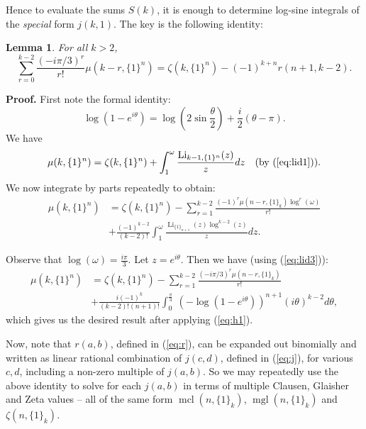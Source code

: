 \documentclass[a4paper,a4paper]{article}
\newtheorem{Lem}{Lemma}
\newcommand{\mcl}{\operatorname{mcl}}
\newcommand{\mgl}{\operatorname{mgl}}
\newcommand{\li}{\operatorname{Li}}
\newcommand{\eop}{\vrule height .9ex width .9ex depth -.1ex}
\begin{document}
\vspace{\baselineskip}

Hence to evaluate the sums $ S(k) $, it is enough to determine log-sine
 integrals of the {\it special} form $ j(k,1) $.
 The key is the following identity:

\begin{Lem} For all $k > 2$,
\begin{equation}
 \sum_{r=0}^{k-2} \frac{(-i\pi/3)^r}{r!} \mu(k-r, \{ 1 \}^n)
 = \zeta(k, \{ 1 \}^n) - (-1)^{k+n}r(n+1, k-2). \label{eq:zp}
\end{equation}
\end{Lem}

{\raggedleft \bf Proof.}
First note the formal identity:
\begin{equation}
\log (1 - e^{i\theta}) = \log \left( 2 \sin \frac{\theta}{2} \right)
+ \frac{i}{2}(\theta - \pi).\label{eq:h1}
\end{equation}
We have
$$
\mu(k, \{ 1 \}^n) = \zeta(k, \{ 1 \}^n)
 + \int_1^\omega \frac{\li_{k-1, \{ 1 \}^n}(z)}{z} dz \quad \text{(by
 (\ref{eq:lid1}))}.
$$
We now integrate by parts repeatedly to obtain:
\begin{equation*}
\begin{split}
\mu(k, \{ 1 \}^n) &= \zeta(k, \{ 1 \}^n) -
\sum_{r=1}^{k-2} \frac{(-1)^r \mu(n-r, \{ 1 \}_k) \log^r(\omega)}{r!} \\
 &+ \frac{(-1)^{k-2}}{(k-2)!} \int_1^\omega \frac{\li_{\{ 1 \}_{n+1}} (z)
 \log^{k-2}(z)}{z}
 dz.
\end{split}
\end{equation*}

Observe that $\log(\omega) = \frac{i\pi}{3} $.  Let $ z = e^{i\theta} $.
  Then we have (using (\ref{eq:lid3})):
\begin{equation*}
\begin{split}
\mu(k, \{ 1 \}^n) &= \zeta(k, \{ 1 \}^n) - \sum_{r=1}^{k-2}
\frac{(-i\pi/3)^r \mu(n-r, \{ 1 \}_k)}{r!} \\
&+ \frac{i(-1)^{k}}{(k-2)! (n+1)!}
\int_0^{\frac{\pi}{3}}\ (-\log(1-e^{i\theta}))^{n+1} (i\theta)^{k-2}
d\theta,
\end{split}
\end{equation*}
which gives us the desired result after applying (\ref{eq:h1}).
\eop

\vspace{\baselineskip}

Now, note that $ r(a,b) $, defined in (\ref{eq:r}), can be expanded out
 binomially and
written
as linear
 rational combination of $ j(c,d) $, defined in (\ref{eq:j}), for various
 $ c, d $, including
 a non-zero multiple of $ j(a, b) $.
 So we may repeatedly use the above identity to solve for each
 $ j(a,b) $ in terms of multiple Clausen, Glaisher and Zeta values -- all
 of the same form
 $ \mcl(n, \{ 1 \}_k)$, $ \mgl(n, \{ 1 \}_k)$ and $\zeta(n, \{ 1 \}_k) $.
\end{document}
